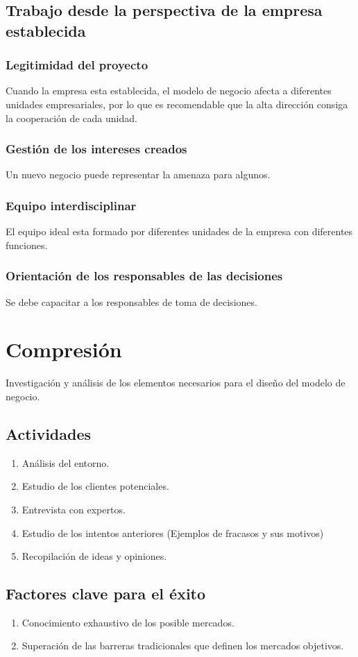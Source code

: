 \documentclass[11pt]{book}
\begin{document}
\subsection{Trabajo desde la perspectiva de la empresa establecida}
\subsubsection{Legitimidad del proyecto}
Cuando la empresa esta establecida, el modelo de negocio afecta a diferentes unidades empresariales, por lo que es recomendable que la alta dirección consiga la cooperación de cada unidad. 
\subsubsection{Gestión de los intereses creados}
Un nuevo negocio puede representar la amenaza para algunos.
\subsubsection{Equipo interdisciplinar}
El equipo ideal esta formado por diferentes unidades de la empresa con diferentes funciones.
\subsubsection{Orientación de los responsables de las decisiones}
Se debe capacitar a los responsables de toma de decisiones.

\section{Compresión}
Investigación y análisis de los elementos necesarios para el diseño del modelo de negocio.
\subsection{Actividades}
\begin{enumerate}
\item Análisis del entorno.
\item Estudio de los clientes potenciales.
\item Entrevista con expertos.
\item Estudio de los intentos anteriores (Ejemplos de fracasos y sus motivos)
\item Recopilación de ideas y opiniones.
\end{enumerate}
\subsection{Factores clave para el éxito}
\begin{enumerate}
\item Conocimiento exhaustivo de los posible mercados.
\item Superación de las barreras tradicionales que definen los mercados objetivos.
\end{enumerate}
\end{document}
